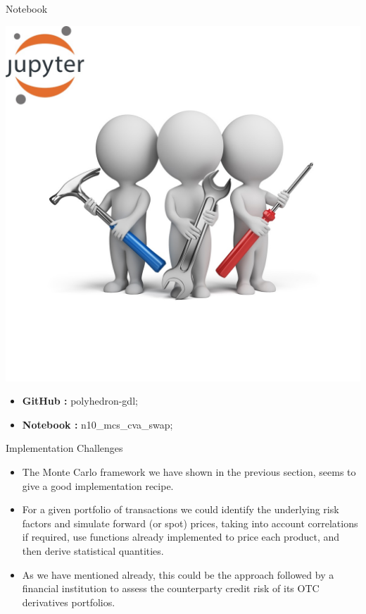 \documentclass[11pt]{beamer}
\begin{document}
\begin{frame}{Notebook}
\noindent\begin{minipage}{0.5\textwidth}%
\includegraphics[width=\linewidth]{img/exercise.jpg}
\end{minipage}%
\hfill%
\begin{minipage}{0.5\textwidth}
\begin{itemize}
\item {\bf GitHub        : }    polyhedron-gdl;
\item {\bf Notebook   : }    n10\_mcs\_cva\_swap;
\end{itemize}
\end{minipage}
\end{frame}
\begin{frame}{Implementation Challenges}
\begin{itemize}
\item The Monte Carlo framework we have shown in the previous section, seems to give
a good implementation recipe. 
\item For a given portfolio of transactions we could 
identify the underlying risk factors and simulate forward (or spot) prices, taking
into account correlations if required, use functions already implemented to price
each product, and then  derive statistical quantities. 
\item As we have mentioned already,
this could be the approach followed by a financial institution to assess the
counterparty credit risk of its OTC derivatives portfolios.
\end{itemize}
\end{frame}
\end{document}
